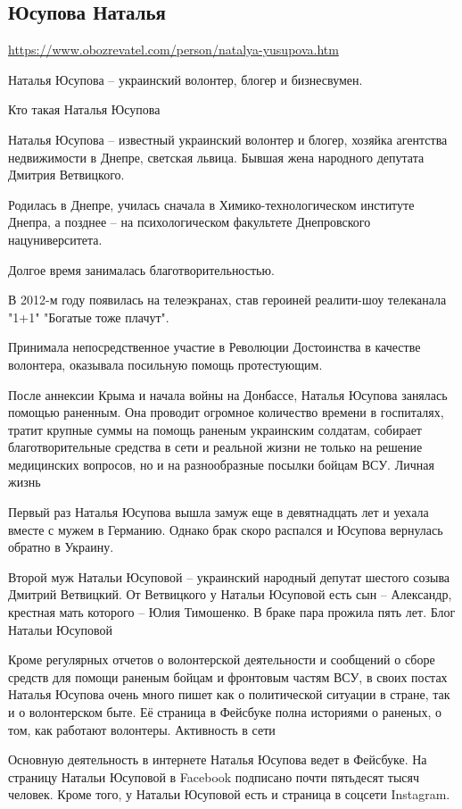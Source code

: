  
 
 
 
 
\subsection{Юсупова Наталья}
\label{sec:auth.jusupova_natalja}
\url{https://www.obozrevatel.com/person/natalya-yusupova.htm}

Наталья Юсупова – украинский волонтер, блогер и бизнесвумен. 

Кто такая Наталья Юсупова

Наталья Юсупова – известный украинский волонтер и блогер, хозяйка агентства
недвижимости в Днепре, светская львица. Бывшая жена народного депутата Дмитрия
Ветвицкого.

Родилась в Днепре, училась сначала в Химико-технологическом институте Днепра, а
позднее – на психологическом факультете Днепровского нацуниверситета.

Долгое время занималась благотворительностью.

В 2012-м году появилась на телеэкранах, став героиней реалити-шоу телеканала
"1+1" "Богатые тоже плачут".

Принимала непосредственное участие в Революции Достоинства в качестве
волонтера, оказывала посильную помощь протестующим.

После аннексии Крыма и начала войны на Донбассе, Наталья Юсупова занялась
помощью раненным. Она проводит огромное количество времени в госпиталях, тратит
крупные суммы на помощь раненым украинским солдатам, собирает благотворительные
средства в сети и реальной жизни не только на решение медицинских вопросов, но
и на разнообразные посылки бойцам ВСУ.  Личная жизнь

Первый раз Наталья Юсупова вышла замуж еще в девятнадцать лет и уехала вместе с
мужем в Германию. Однако брак скоро распался и Юсупова вернулась обратно в
Украину.

Второй муж Натальи Юсуповой – украинский народный депутат шестого созыва
Дмитрий Ветвицкий. От Ветвицкого у Натальи Юсуповой есть сын – Александр,
крестная мать которого – Юлия Тимошенко. В браке пара прожила пять лет.  Блог
Натальи Юсуповой

Кроме регулярных отчетов о волонтерской деятельности и сообщений о сборе
средств для помощи раненым бойцам и фронтовым частям ВСУ, в своих постах
Наталья Юсупова очень много пишет как о политической ситуации в стране, так и о
волонтерском быте. Её страница в Фейсбуке полна историями о раненых, о том, как
работают волонтеры.  Активность в сети

Основную деятельность в интернете Наталья Юсупова ведет в Фейсбуке. На страницу
Натальи Юсуповой в Facebook подписано почти пятьдесят тысяч человек. Кроме
того, у Натальи Юсуповой есть и страница в соцсети Instagram.
